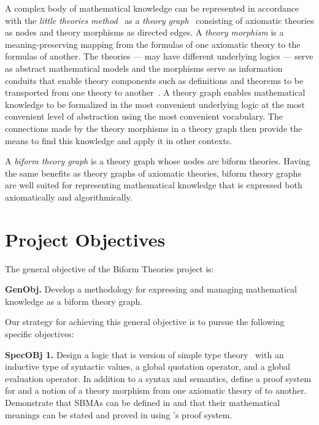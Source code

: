 \documentclass[fleqn]{llncs}
\begin{document}
A complex body of mathematical knowledge can be represented in
accordance with the \emph{little theories method}~\cite{FarmerEtAl92b}
as a \emph{theory graph}~\cite{Kohlhase14} consisting of axiomatic
theories as nodes and theory morphisms as directed edges.  A
\emph{theory morphism} is a meaning-preserving mapping from the
formulas of one axiomatic theory to the formulas of another.  The
theories --- may have different underlying logics --- serve as
abstract mathematical models and the morphisms serve as information
conduits that enable theory components such as definitions and
theorems to be transported from one theory to
another~\cite{BarwiseSeligman97}.  A theory graph enables mathematical
knowledge to be formalized in the most convenient underlying logic at
the most convenient level of abstraction using the most convenient
vocabulary.  The connections made by the theory morphisms in a theory
graph then provide the means to find this knowledge and apply it in
other contexts.

A \emph{biform theory graph} is a theory graph whose nodes are biform
theories. Having the same benefits as theory graphs of axiomatic
theories, biform theory graphs are well suited for representing
mathematical knowledge that is expressed both axiomatically and
algorithmically.
  
\section{Project Objectives}

The general objective of the Biform Theories project is:

\bi

  \item[] \textbf{GenObj.} Develop a methodology for expressing and
    managing mathematical knowledge as a biform theory graph.

\ei

\noindent
Our strategy for achieving this general objective is to pursue the
following specific objectives:

\bi

  \item[]\textbf{SpecOBj 1.} Design a logic  that is
    version of simple type theory~\cite{Farmer08} with an inductive
    type of syntactic values, a global quotation operator, and a
    global evaluation operator.  In addition to a syntax and
    semantics, define a proof system for  and a notion of a
    theory morphism from one axiomatic theory of  to
    another.  Demonstrate that SBMAs can be defined in  and
    that their mathematical meanings can be stated and proved in using
    's proof system.
\end{document}
